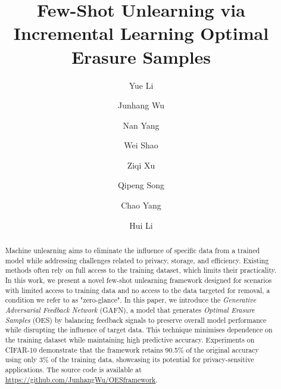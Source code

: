 \documentclass[preprint,12pt]{elsarticle}
\begin{document}
\begin{frontmatter}

\title{Few-Shot Unlearning via Incremental Learning Optimal Erasure Samples}


            

\author[xd]{Yue Li} %


\author[xd]{Junhang Wu} %

\author[xd]{Nan Yang} %

\author[data61,unsw]{Wei Shao} %


\author[RMIT]{Ziqi Xu} %


\author[xd]{Qipeng Song}


\author[xd]{Chao Yang} %
\author[xd]{Hui Li} %


\begin{abstract}

Machine unlearning aims to eliminate the influence of specific data from a trained model while addressing challenges related to privacy, storage, and efficiency. Existing methods often rely on full access to the training dataset, which limits their practicality. In this work, we present a novel few-shot unlearning framework designed for scenarios with limited access to training data and no access to the data targeted for removal, a condition we refer to as "zero-glance". In this paper, we introduce the \textit{Generative Adversarial Feedback Network} (GAFN), a model that generates \textit{Optimal Erasure Samples} (OES) by balancing feedback signals to preserve overall model performance while disrupting the influence of target data. This technique minimises dependence on the training dataset while maintaining high predictive accuracy. Experiments on CIFAR-10 demonstrate that the framework retains 90.5\% of the original accuracy using only 3\% of the training data, showcasing its potential for privacy-sensitive applications. The source code is available at \url{https://github.com/JunhangWu/OESframework}.



\end{abstract}
\end{frontmatter}
\end{document}
